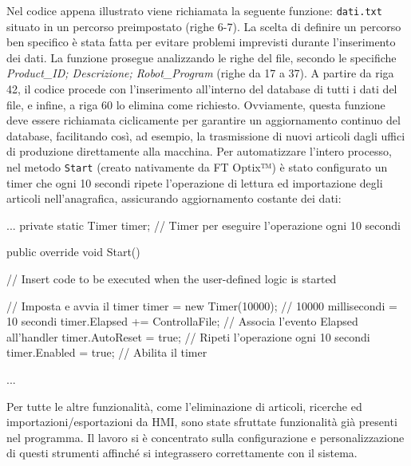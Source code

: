 Nel codice appena illustrato viene richiamata la seguente funzione: \verb|dati.txt| situato in un percorso preimpostato (righe 6-7). La scelta di definire un percorso ben specifico è stata fatta per evitare problemi imprevisti durante l'inserimento dei dati. La funzione prosegue analizzando le righe del file, secondo le specifiche \textit{Product\_ID; Descrizione; Robot\_Program} (righe da 17 a 37). A partire da riga 42, il codice procede con l'inserimento all'interno del database di tutti i dati del file, e infine, a riga 60 lo elimina come richiesto. Ovviamente, questa funzione deve essere richiamata ciclicamente per garantire un aggiornamento continuo del database, facilitando così, ad esempio, la trasmissione di nuovi articoli dagli uffici di produzione direttamente alla macchina. Per automatizzare l'intero processo, nel metodo \verb|Start| (creato nativamente da FT Optix™) è stato configurato un timer che ogni 10 secondi ripete l'operazione di lettura ed importazione degli articoli nell'anagrafica, assicurando aggiornamento costante dei dati:
\begin{csharp}
...
    private static Timer timer; // Timer per eseguire l'operazione ogni 10 secondi

    public override void Start()
    {
        // Insert code to be executed when the user-defined logic is started
        
        // Imposta e avvia il timer
        timer = new Timer(10000); // 10000 millisecondi = 10 secondi
        timer.Elapsed += ControllaFile; // Associa l'evento Elapsed all'handler
        timer.AutoReset = true; // Ripeti l'operazione ogni 10 secondi
        timer.Enabled = true; // Abilita il timer
    }
...
\end{csharp}
Per tutte le altre funzionalità, come l'eliminazione di articoli, ricerche ed importazioni/esportazioni da HMI, sono state sfruttate funzionalità già presenti nel programma. Il lavoro si è concentrato sulla configurazione e personalizzazione di questi strumenti affinché si integrassero correttamente con il sistema.

